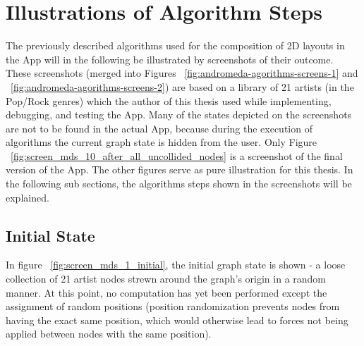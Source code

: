 \section{Illustrations of Algorithm Steps}

The previously described algorithms used for the composition of 2D layouts in the App will in the following be illustrated by screenshots of their outcome. These screenshots (merged into Figures ~\ref{fig:andromeda-agorithms-screens-1} and ~\ref{fig:andromeda-agorithms-screens-2}) are based on a library of 21 artists (in the Pop/Rock genres) which the author of this thesis used while implementing, debugging, and testing the App. Many of the states depicted on the screenshots are not to be found in the actual App, because during the execution of algorithms the current graph state is hidden from the user. Only Figure ~\ref{fig:screen_mds_10_after_all_uncollided_nodes} is a screenshot of the final version of the App. The other figures serve as pure illustration for this thesis. In the following sub sections, the algorithms steps shown in the screenshots will be explained.

\subsection{Initial State}

In figure ~\ref{fig:screen_mds_1_initial}, the initial graph state is shown - a loose collection of 21 artist nodes strewn around the graph's origin in a random manner. At this point, no computation has yet been performed except the assignment of random positions (position randomization prevents nodes from having the exact same position, which would otherwise lead to forces not being applied between nodes with the same position).

